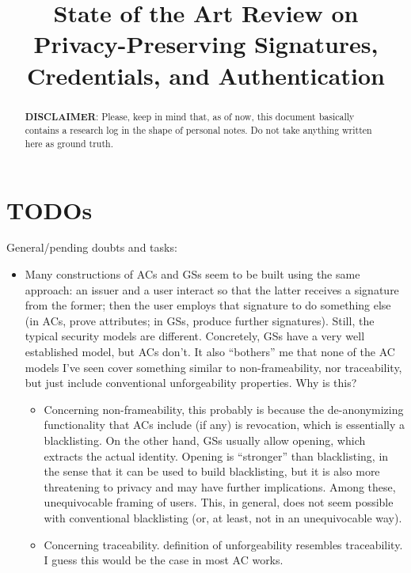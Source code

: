 \documentclass{llncs}%
\title{State of the Art Review on Privacy-Preserving Signatures, Credentials, and Authentication}
\author{}
\begin{document}
\maketitle


\begin{abstract}
	\textbf{DISCLAIMER}: Please, keep in mind that, as of now, this document
	basically contains a research log in the shape of personal notes. Do not take 
	anything written here as ground truth.
\end{abstract}



%









\appendix

\section{TODOs}

General/pending doubts and tasks:

\begin{itemize}
\item Many constructions of ACs and GSs seem to be built using the same
  approach: an issuer and a user interact so that the latter receives a signature
  from the former; then the user employs that signature to do something else (in
  ACs, prove attributes; in GSs, produce further signatures). Still, the typical
  security models are different. Concretely, GSs have a very well established
  model, but ACs don't. It also ``bothers'' me that none of the AC models I've
  seen cover something similar to non-frameability, nor traceability, but just
  include conventional unforgeability properties. Why is this?
  \begin{itemize}
  \item Concerning non-frameability, this probably is because the de-anonymizing
    functionality that ACs include (if any) is revocation, which is essentially
    a blacklisting. On the other hand, GSs usually allow opening, which extracts
    the actual identity. Opening is ``stronger'' than blacklisting, in the sense
    that it can be used to build blacklisting, but it is also more threatening
    to privacy and may have further implications. Among these, unequivocable
    framing of users. This, in general, does not seem possible with conventional
    blacklisting (or, at least, not in an unequivocable way).
  \item Concerning traceability. \cite{fhs19} definition of unforgeability
    resembles traceability. I guess this would be the case in most AC works.
  \end{itemize}
\end{itemize}


\end{document}
